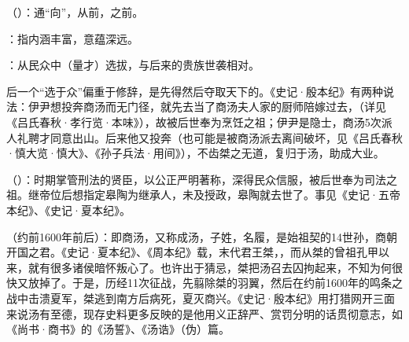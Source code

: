 {
\item {}（）：通“向”，从前，之前。
\item {}：指内涵丰富，意蕴深远。
\item {}：从民众中（量才）选拔，与后来的贵族世袭相对。

后一个“选于众”偏重于修辞，是先得然后夺取天下的。《史记·殷本纪》有两种说法：伊尹想投奔商汤而无门径，就先去当了商汤夫人家的厨师陪嫁过去，（详见《吕氏春秋·孝行览·本味》），故被后世奉为烹饪之祖；伊尹是隐士，商汤5次派人礼聘才同意出山。后来他又投奔（也可能是被商汤派去离间破坏，见《吕氏春秋·慎大览·慎大》、《孙子兵法·用间》），不齿桀之无道，复归于汤，助成大业。

\item {}（）：时期掌管刑法的贤臣，以公正严明著称，深得民众信服，被后世奉为司法之祖。继帝位后想指定皋陶为继承人，未及授政，皋陶就去世了。事见《史记·五帝本纪》、《史记·夏本纪》。%

\item {}（约前1600年前后）：即商汤，又称成汤，子姓，名履，是始祖契的14世孙，商朝开国之君。《史记·夏本纪》、《周本纪》载，末代君王桀，，而从桀的曾祖孔甲以来，就有很多诸侯暗怀叛心了。也许出于猜忌，桀把汤召去囚拘起来，不知为何很快又放掉了。于是，历经11次征战，先翦除桀的羽翼，然后在约前1600年的鸣条之战中击溃夏军，桀逃到南方后病死，夏灭商兴。《史记·殷本纪》用打猎网开三面来说汤有至德，现存史料更多反映的是他用义正辞严、赏罚分明的话贯彻意志，如《尚书·商书》的《汤誓》、《汤诰》（伪）篇。

}
